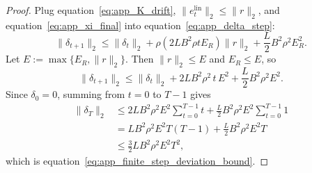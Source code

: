 \documentclass[10pt,a4paper]{amsart}
\def\eqref#1{equation~\ref{#1}}
\begin{document}
\begin{proof}
Plug \eqref{eq:app_K_drift}, $\|e_t^{\mathrm{lin}}\|_2\le \|r\|_2$, and \eqref{eq:app_xi_final} into \eqref{eq:app_delta_step}:
\[
\|\delta_{t+1}\|_2
\le
\|\delta_t\|_2
+
\rho  (2LB^2\rho t E_R)  \|r\|_2
+
\frac{L}{2}B^2\rho^2 E_R^2.
\]
Let $E:=\max\{E_R,\|r\|_2\}$. Then $\|r\|_2\le E$ and $E_R\le E$, so
\[
\|\delta_{t+1}\|_2
\le
\|\delta_t\|_2
+
2LB^2\rho^2\,t\,E^2
+
\frac{L}{2}B^2\rho^2 E^2.
\]
Since $\delta_0=0$, summing from $t=0$ to $T-1$ gives
\begin{align*}
    \|\delta_T\|_2 &\le 2LB^2\rho^2 E^2 \sum_{t=0}^{T-1} t + \frac{L}{2}B^2\rho^2 E^2 \sum_{t=0}^{T-1} 1 \\
    &= LB^2\rho^2 E^2 T(T-1) + \frac{L}{2}B^2\rho^2 E^2 T \\
    &\le \frac{3}{2}LB^2\rho^2 E^2 T^2,
\end{align*}
which is \eqref{eq:app_finite_step_deviation_bound}.
\end{proof}
\end{document}
